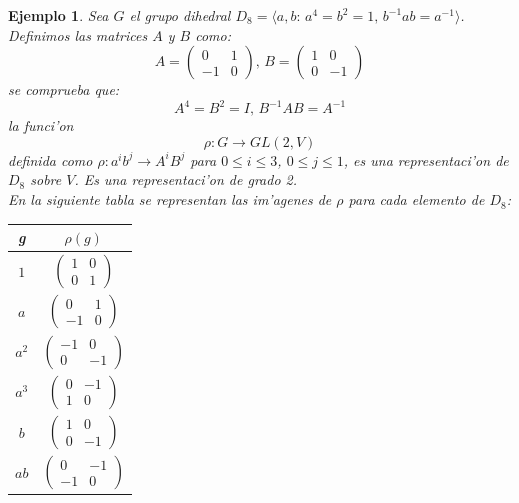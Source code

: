 \documentclass[a4paper,openright,12pt]{report}
\numberwithin{equation}{section} %
\newtheorem{ejemplo}{Ejemplo}[section] %
\begin{document}
\begin{ejemplo}
Sea $G$ el grupo dihedral $D_8=\langle a,b:\, a^{4}=b^{2}=1,\, b^{-1}ab=a^{-1} \rangle$. Definimos las matrices $A$ y $B$ como:
\[
A= \left( \begin{array}{cc}
0 & 1  \\
-1 & 0  \end{array} \right),\,
B= \left( \begin{array}{cc}
1 & 0  \\
0 & -1  \end{array} \right)
\] 
se comprueba que:
\[
A^{4}=B^{2}=I, \, B^{-1}AB=A^{-1}
\]
la funci'on
\[
\rho : G \rightarrow GL(2,V)
\]
definida como $\rho: a^{i}b^{j} \rightarrow A^{i}B^{j}$ para $0\leq i \leq 3$, $0\leq j \leq 1$, es una representaci'on de $D_{8}$ sobre $V$. Es una representaci'on de grado 2.\\
En la siguiente tabla se representan las im'agenes de $\rho$ para cada elemento de $D_{8}$:
\begin{table}[H]
\begin{center}
\begin{tabular}{|c|c|}
\hline
g & $\rho (g)$ \\
\hline \hline
$1$ & $\left( \begin{array}{cc}
1 & 0  \\
0 & 1  \end{array} \right)$ \\ \hline 
$a$ & $\left( \begin{array}{cc}
0 & 1  \\
-1 & 0  \end{array} \right)$ \\ \hline
$a^{2}$ & $\left( \begin{array}{cc}
-1 & 0  \\
0 & -1  \end{array} \right)$ \\ \hline
$a^{3}$ & $\left( \begin{array}{cc}
0 & -1  \\
1 & 0  \end{array} \right)$ \\ \hline
$b$ & $\left( \begin{array}{cc}
1 & 0  \\
0 & -1  \end{array} \right)$ \\ \hline
$ab$ & $\left( \begin{array}{cc}
0 & -1  \\
-1 & 0  \end{array} \right)$ \\ \hline

\end{tabular}
\end{center}
\end{table}
\end{ejemplo}
\end{document}
